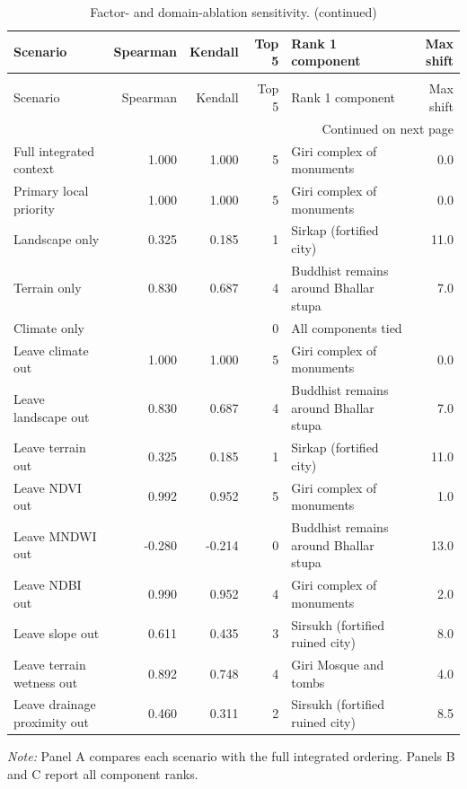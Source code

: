 \begin{landscape}
\begingroup
\scriptsize
\setlength{\tabcolsep}{3pt}
\begin{longtable}{p{}rrrp{}r}
\caption{Factor- and domain-ablation sensitivity.}\label{tab:s-ablation}\\
\toprule
Scenario & Spearman & Kendall & Top 5 & Rank 1 component & Max shift \\
\midrule
\endfirsthead
\caption[]{Factor- and domain-ablation sensitivity. (continued)}\\
\toprule
Scenario & Spearman & Kendall & Top 5 & Rank 1 component & Max shift \\
\midrule
\endhead
\midrule
\multicolumn{6}{r}{Continued on next page}\\
\endfoot
\bottomrule
\endlastfoot
Full integrated context & 1.000 & 1.000 & 5 & Giri complex of monuments & 0.0 \\
Primary local priority & 1.000 & 1.000 & 5 & Giri complex of monuments & 0.0 \\
Landscape only & 0.325 & 0.185 & 1 & Sirkap (fortified city) & 11.0 \\
Terrain only & 0.830 & 0.687 & 4 & Buddhist remains around Bhallar stupa & 7.0 \\
Climate only &  &  & 0 & All components tied &  \\
Leave climate out & 1.000 & 1.000 & 5 & Giri complex of monuments & 0.0 \\
Leave landscape out & 0.830 & 0.687 & 4 & Buddhist remains around Bhallar stupa & 7.0 \\
Leave terrain out & 0.325 & 0.185 & 1 & Sirkap (fortified city) & 11.0 \\
Leave NDVI out & 0.992 & 0.952 & 5 & Giri complex of monuments & 1.0 \\
Leave MNDWI out & -0.280 & -0.214 & 0 & Buddhist remains around Bhallar stupa & 13.0 \\
Leave NDBI out & 0.990 & 0.952 & 4 & Giri complex of monuments & 2.0 \\
Leave slope out & 0.611 & 0.435 & 3 & Sirsukh (fortified ruined city) & 8.0 \\
Leave terrain wetness out & 0.892 & 0.748 & 4 & Giri Mosque and tombs & 4.0 \\
Leave drainage proximity out & 0.460 & 0.311 & 2 & Sirsukh (fortified ruined city) & 8.5 \\
\end{longtable}
\noindent\textit{Note:} Panel A compares each scenario with the full integrated ordering. Panels B and C report all component ranks.

\end{landscape}
